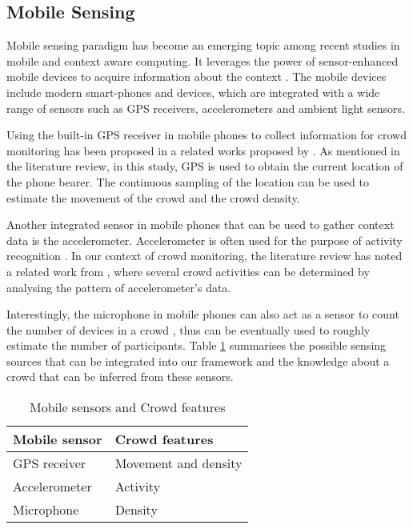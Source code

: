 \subsection{Mobile Sensing}

Mobile sensing paradigm has become an emerging topic among recent studies in mobile and context aware computing. It leverages the power of sensor-enhanced mobile devices to acquire information about the context \citep{guo2014participatory}. The mobile devices include modern smart-phones and devices, which are integrated with a wide range of sensors such as GPS receivers, accelerometers and ambient light sensors.

Using the built-in GPS receiver in mobile phones to collect information for crowd monitoring has been proposed in a related works proposed by \citet{Wirz2012}. As mentioned in the literature review, in this study, GPS is used to obtain the current location of the phone bearer. The continuous sampling of the location can be used to estimate the movement of the crowd and the crowd density.

Another integrated sensor in mobile phones that can be used to gather context data is the accelerometer. Accelerometer is often used for the purpose of activity recognition \citep{ravi2005activity, kwapisz2011activity}. In our context of crowd monitoring, the literature review has noted a related work from \citet{Roggen2011}, where several crowd activities can be determined by analysing the pattern of accelerometer's data.

Interestingly, the microphone in mobile phones can also act as a sensor to count the number of devices in a crowd \citep{Kannan2012, Xu2013}, thus can be eventually used to roughly estimate the number of participants. Table \ref{table:mobileSensingCrowdFeature} summarises the possible sensing sources that can be integrated into our framework and the knowledge about a crowd that can be inferred from these sensors.

\begin{table}
\caption{Mobile sensors and Crowd features}
\label{table:mobileSensingCrowdFeature}
\centering
\begin{tabular}{|l|l|}
\hline
\textbf{Mobile sensor} & \textbf{Crowd features} \\
\hline
GPS receiver & Movement and density \\
\hline
Accelerometer & Activity \\
\hline
Microphone & Density \\
\hline
\end{tabular}
\end{table}


